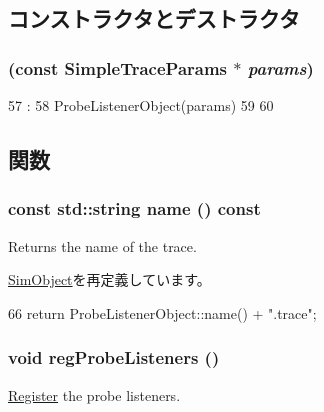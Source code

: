 \subsection{コンストラクタとデストラクタ}
\hypertarget{classSimpleTrace_a7ce7f197366d8c2bf9967cdcc0d418c1}{
\subsubsection[{SimpleTrace}]{ (const SimpleTraceParams $\ast$ {\em params})}}
\label{classSimpleTrace_a7ce7f197366d8c2bf9967cdcc0d418c1}



\begin{DoxyCode}
57                                                 :
58         ProbeListenerObject(params)
59     {
60     }

\end{DoxyCode}


\subsection{関数}
\hypertarget{classSimpleTrace_a6490f765a824ced1cc94979609fe7e07}{
\subsubsection[{name}]{\setlength{\rightskip}{0pt plus 5cm}const std::string name () const}}
\label{classSimpleTrace_a6490f765a824ced1cc94979609fe7e07}
Returns the name of the trace. 

\hyperlink{classSimObject_adbcff144e5e199d332a1352af1798148}{SimObject}を再定義しています。


\begin{DoxyCode}
66 { return ProbeListenerObject::name() + ".trace"; }
\end{DoxyCode}
\hypertarget{classSimpleTrace_aa58a8221691801138d5d9236b8c3e0fb}{
\subsubsection[{regProbeListeners}]{\setlength{\rightskip}{0pt plus 5cm}void regProbeListeners ()}}
\label{classSimpleTrace_aa58a8221691801138d5d9236b8c3e0fb}
\hyperlink{classRegister}{Register} the probe listeners. 

